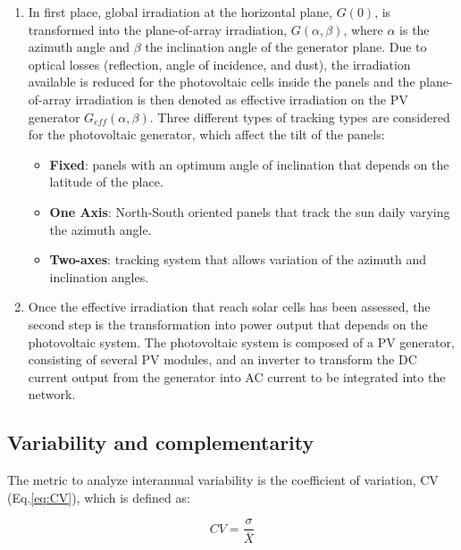\begin{enumerate}

\item In first place, global irradiation at the horizontal plane, $G(0)$, is transformed into the plane-of-array irradiation,  $G(\alpha, \beta)$, where $\alpha$ is the azimuth angle and $\beta$ the inclination angle of the generator plane. Due to optical losses (reflection, angle of incidence, and dust), the irradiation available is reduced for the photovoltaic cells inside the panels and the plane-of-array irradiation is then denoted as effective irradiation on the PV generator $G_{eff}(\alpha, \beta)$.
Three different types of tracking types are considered for the photovoltaic generator, which affect the tilt of the panels:
\begin{itemize}
\item \textbf{Fixed}: panels with an optimum angle of inclination that depends on the latitude of the place.
\item \textbf{One Axis}: North-South oriented panels that track the sun daily varying the azimuth angle.
\item \textbf{Two-axes}: tracking system that allows variation of the azimuth and inclination angles.
\end{itemize}
  
\item Once the effective irradiation that reach solar cells has been assessed, the second step is the transformation into power output that depends on the photovoltaic system. The photovoltaic system is composed of a PV generator, consisting of several PV modules, and an inverter to transform the DC current output from the generator into AC current to be integrated into the network. %

\end{enumerate}

\subsection{Variability and complementarity}

The metric to analyze interannual variability is the coefficient of variation, CV (Eq.\ref{eq:CV}), which is defined as:

\begin{equation}\label{eq:CV}
  CV=\frac{\sigma}{\overline{X}}
\end{equation}

